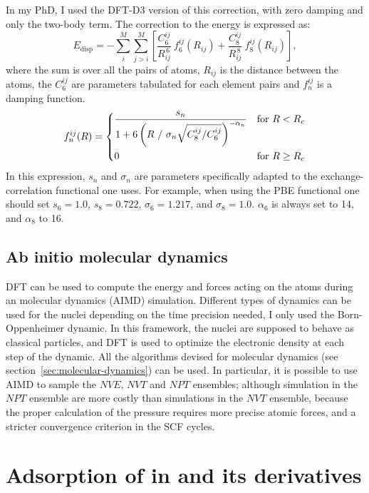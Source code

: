\documentclass[thesis]{subfiles}
\begin{document}
In my PhD, I used the DFT-D3 version of this correction\cite{Grimme2010}, with
zero damping and only the two-body term. The correction to the energy is
expressed as:
\[E_\text{disp} = - \sum_i^M\sum_{j>i}^M\left[\frac{C_6^{ij}}{R_{ij}^{\,6}} \ f_6^{ij}(R_{ij}) + \frac{C_8^{ij}}{R_{ij}^{\,8}} \ f_8^{ij}(R_{ij})\right],\]
where the sum is over all the pairs of atoms, $R_{ij}$ is the distance between
the atoms, the $C_6^{ij}$ are parameters tabulated for each element pairs and
$f_n^{ij}$ is a damping function.
\[f_n^{ij}(R) =
\begin{dcases}
    \frac{s_n}{1 + 6 \left(R\ /\ \sigma_n \sqrt{C_8^{ij} / C_6^{ij}}\right)^{-\alpha_n}} &\text{for } R < R_c \\
    0 &\text{for } R \geq R_c \\
\end{dcases}\]
In this expression, $s_n$ and $\sigma_n$ are parameters specifically adapted to
the ex\-change-cor\-rela\-tion functional one uses. For example, when using the
PBE functional one should set $s_6 = 1.0$, $s_8 = 0.722$, $\sigma_6 = 1.217$,
and $\sigma_8 = 1.0$. $\alpha_6$ is always set to 14, and $\alpha_8$ to 16.

\subsection{Ab initio molecular dynamics}

DFT can be used to compute the energy and forces acting on the atoms during an
\abinitio molecular dynamics (AIMD) simulation. Different types of dynamics can
be used for the nuclei depending on the time precision needed, I only used the
Born-Oppenheimer dynamic. In this framework, the nuclei are supposed to behave
as classical particles, and DFT is used to optimize the electronic density at
each step of the dynamic. All the algorithms devised for molecular dynamics (see
section~\ref{sec:molecular-dynamics}) can be used. In particular, it is possible
to use AIMD to sample the $NVE$, $NVT$ and $NPT$ ensembles; although simulation
in the $NPT$ ensemble are more costly than simulations in the $NVT$ ensemble,
because the proper calculation of the pressure requires more precise atomic
forces, and a stricter convergence criterion in the SCF cycles.

\newpage
\section{Adsorption of  in  and its derivatives}
\label{sec:zif8x}
\end{document}
